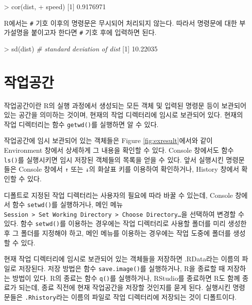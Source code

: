 \documentclass[
]{book}
\newenvironment{Shaded}{\begin{snugshade}}{\end{snugshade}}
\newcommand{\CommentTok}[1]{\textcolor[rgb]{0.56,0.35,0.01}{\textit{#1}}}
\newcommand{\DecValTok}[1]{\textcolor[rgb]{0.00,0.00,0.81}{#1}}
\newcommand{\FloatTok}[1]{\textcolor[rgb]{0.00,0.00,0.81}{#1}}
\newcommand{\FunctionTok}[1]{\textcolor[rgb]{0.00,0.00,0.00}{#1}}
\newcommand{\NormalTok}[1]{#1}
\newcommand{\SpecialCharTok}[1]{\textcolor[rgb]{0.00,0.00,0.00}{#1}}
\begin{document}
\begin{Shaded}
\begin{Highlighting}[]
\SpecialCharTok{\textgreater{}} \FunctionTok{cor}\NormalTok{(dist,}
\SpecialCharTok{+}\NormalTok{     speed)}
\NormalTok{[}\DecValTok{1}\NormalTok{] }\FloatTok{0.9176971}
\end{Highlighting}
\end{Shaded}

R에서는 \texttt{\#} 기호 이후의 명령문은 무시되어 처리되지 않는다. 따라서
명령문에 대한 부가설명을 붙이고자 한다면 \texttt{\#} 기호 후에 입력하면 된다.

\begin{Shaded}
\begin{Highlighting}[]
\SpecialCharTok{\textgreater{}} \FunctionTok{sd}\NormalTok{(dist)  }\CommentTok{\# standard deviation of dist}
\NormalTok{[}\DecValTok{1}\NormalTok{] }\FloatTok{10.22035}
\end{Highlighting}
\end{Shaded}

\hypertarget{uxc791uxc5c5uxacf5uxac04}{%
\section{작업공간}\label{uxc791uxc5c5uxacf5uxac04}}

작업공간이란 R의 실행 과정에서 생성되는 모든 객체 및 입력된 명령문 등이
보관되어 있는 공간을 의미하는 것이며, 현재의 작업 디렉터리에 임시로
보관되어 있다. 현재의 작업 디렉터리는 함수 \texttt{getwd()}를 실행하면 알 수
있다.

작업공간에 임시 보관되어 있는 객체들은 Figure \ref{fig:exresult}에서와
같이 Environment 창에서 상세하게 그 내용을 확인할 수 있다. Console
창에서도 함수 \texttt{ls()}를 실행시키면 임시 저장된 객체들의 목록을 얻을 수
있다. 앞서 실행시킨 명령문들은 Console 창에서 \texttt{↑} 또는 \texttt{↓}의 화살표 키를
이용하여 확인하거나, History 창에서 확인할 수 있다.

디폴트로 지정된 작업 디렉터리는 사용자의 필요에 따라 바꿀 수 있는데,
Console 창에서 함수 \texttt{setwd()}를 실행하거나, 메인 메뉴
\texttt{Session\ \textgreater{}\ Set\ Working\ Directory\ \textgreater{}\ Choose\ Directory…}을 선택하여 변경할
수 있다. 함수 \texttt{setwd()}를 이용하는 경우에는 작업 디렉터리로 사용할
폴더를 미리 생성한 후 그 폴더를 지정해야 하고, 메인 메뉴를 이용하는
경우에는 작업 도중에 폴더를 생성할 수 있다.

현재 작업 디렉터리에 임시로 보관되어 있는 객체들을 저장하면 .RData라는
이름의 파일로 저장된다. 저장 방법은 함수 \texttt{save.image()}를 실행하거나,
R을 종료할 때 저장하는 방법이 있다.
R의 종료는 함수 \texttt{q()}를 실행하거나, RStudio를 종료하면 R도 함께 종료가 되는데, 종료 직전에 현재 작업공간을 저장할 것인지를 묻게 된다.
실행시킨 명령문들은 \texttt{.Rhistory}라는 이름의 파일로 작업 디렉터리에 저장되는 것이
디폴트이다.
\end{document}
